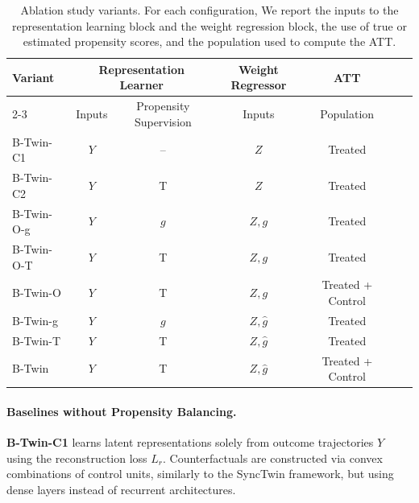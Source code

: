 \documentclass[10pt]{article} %
\begin{document}
\begin{table}[t]
\centering
\small
\begin{tabular}{lcccccc}
\hline
\textbf{Variant} 
& \multicolumn{2}{c}{\textbf{Representation Learner}} 
& \multicolumn{1}{c}{\textbf{Weight Regressor}} 
& \textbf{ATT} \\
\cline{2-3} \cline{4-5}
& Inputs & Propensity Supervision
& Inputs 
& Population \\
\hline
B-Twin-C1 
& $Y$ 
& -- 
& $Z$ 

& Treated \\

B-Twin-C2 
& $Y$ 
& T
& $Z$ 

& Treated \\

B-Twin-O-g 
& $Y$ 
& $g$ 
& $Z, g$ 

& Treated \\

B-Twin-O-T 
& $Y$ 
& T 
& $Z, g$ 

& Treated \\

B-Twin-O 
& $Y$ 
& T 
& $Z, g$ 

& Treated + Control \\

B-Twin-g 
& $Y$ 
& $g$ 
& $Z, \hat{g}$ 

& Treated \\

B-Twin-T 
& $Y$ 
& T 
& $Z, \hat{g}$ 

& Treated \\

B-Twin 
& $Y$ 
& T
& $Z, \hat{g}$ 

& Treated + Control \\
\hline
\end{tabular}
\caption{Ablation study variants. For each configuration, We report the inputs to the representation learning block and the weight regression block, the use of true or estimated propensity scores, and the population used to compute the ATT.}
\label{tab:ablation_variants}
\end{table}

\paragraph{Baselines without Propensity Balancing.}
\textbf{B-Twin-C1} learns latent representations solely from outcome trajectories \(Y\) using the reconstruction loss \(L_r\). Counterfactuals are constructed via convex combinations of control units, similarly to the SyncTwin framework, but using dense layers instead of recurrent architectures.
\end{document}
